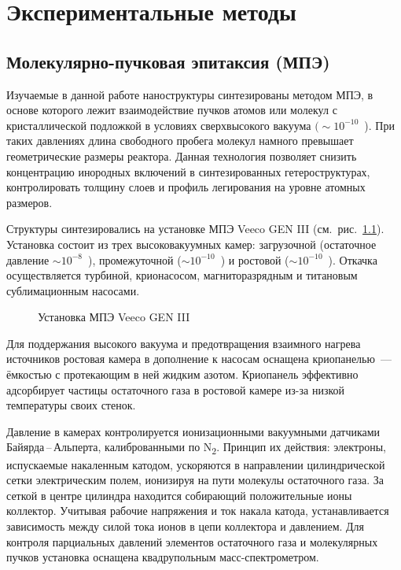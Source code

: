 \chapter{Экспериментальные методы}\label{ch:ch2}

\section{Молекулярно-пучковая эпитаксия (МПЭ)}\label{sec:ch2/sec1}

Изучаемые в данной работе наноструктуры синтезированы методом МПЭ, в основе
которого лежит взаимодействие пучков атомов или молекул с кристаллической
подложкой в условиях сверхвысокого вакуума \((\sim 10^{-10}\)~\si{\torr}). При
таких давлениях длина свободного пробега молекул намного превышает
геометрические размеры реактора. Данная технология позволяет снизить
концентрацию инородных включений в синтезированных гетероструктурах,
контролировать толщину слоев и профиль легирования на уровне атомных размеров.

Структуры синтезировались на установке МПЭ Veeco GEN III
(см.~рис.~\cref{fig:Image_10}). Установка состоит из трех высоковакуумных
камер: загрузочной (остаточное давление \(\sim 10^{-8}\)~\si{\torr}),
промежуточной (\(\sim 10^{-10}\)~\si{\torr}) и ростовой (\(\sim
10^{-10}\)~\si{\torr}). Откачка осуществляется турбиной, крионасосом,
магниторазрядным и титановым сублимационным насосами.

\begin{figure}[ht]  \caption{Установка МПЭ Veeco
GEN III}\label{fig:Image_10} \end{figure}

Для поддержания высокого вакуума и предотвращения взаимного нагрева источников
ростовая камера в дополнение к насосам оснащена криопанелью~--- ёмкостью с
протекающим в ней жидким азотом. Криопанель эффективно адсорбирует частицы
остаточного газа в ростовой камере из-за низкой температуры своих стенок.

Давление в камерах контролируется ионизационными вакуумными датчиками
Байярда\,--\,Альперта, калиброванными по N\textsubscript{2}. Принцип их
действия: электроны, испускаемые накаленным катодом, ускоряются в направлении
цилиндрической сетки электрическим полем, ионизируя на пути молекулы
остаточного газа. За сеткой в центре цилиндра находится собирающий
положительные ионы коллектор. Учитывая рабочие напряжения и ток накала катода,
устанавливается зависимость между силой тока ионов в цепи коллектора и
давлением. Для контроля парциальных давлений элементов остаточного газа и
молекулярных пучков установка оснащена квадрупольным масс-спектрометром.

